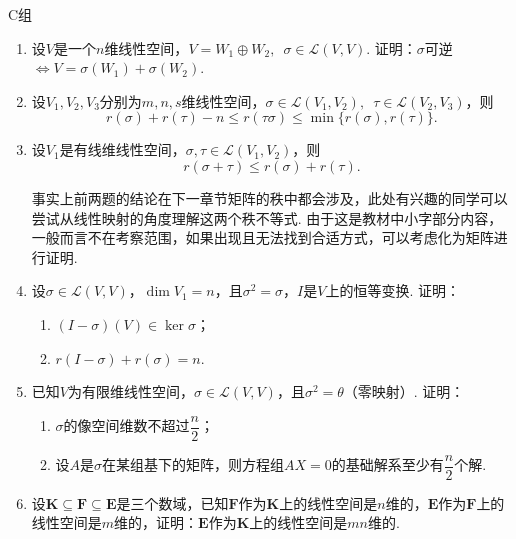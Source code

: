 \centerline{\heiti C组}
\begin{enumerate}
    \item 设$V$是一个$n$维线性空间，$V=W_1\oplus W_2,\enspace\sigma\in \mathcal{L}(V,V)$. 证明：$\sigma$可逆$\iff V=\sigma(W_1)+\sigma(W_2)$.

    \item 设$V_1,V_2,V_3$分别为$m,n,s$维线性空间，$\sigma\in \mathcal{L}(V_1,V_2),\enspace\tau\in \mathcal{L}(V_2,V_3)$，则
          \[r(\sigma)+r(\tau)-n \leqslant r(\tau\sigma) \leqslant \min\{r(\sigma),r(\tau)\}.\]

    \item 设$V_1$是有线维线性空间，$\sigma,\tau\in \mathcal{L}(V_1,V_2)$，则
          \[r(\sigma+\tau) \leqslant r(\sigma)+r(\tau).\]

          事实上前两题的结论在下一章节矩阵的秩中都会涉及，此处有兴趣的同学可以尝试从线性映射的角度理解这两个秩不等式. 由于这是教材中小字部分内容，一般而言不在考察范围，如果出现且无法找到合适方式，可以考虑化为矩阵进行证明.

    \item 设$\sigma\in \mathcal{L}(V,V)$，$\dim V_1=n$，且$\sigma^2=\sigma$，$I$是$V$上的恒等变换. 证明：
          \begin{enumerate}
              \item $(I-\sigma)(V) \in \ker\sigma$；

              \item $r(I-\sigma)+r(\sigma)=n$.
          \end{enumerate}

    \item 已知$V$为有限维线性空间，$\sigma\in \mathcal{L}(V,V)$，且$\sigma^2=\theta$（零映射）. 证明：
          \begin{enumerate}
              \item $\sigma$的像空间维数不超过$\dfrac{n}{2}$；

              \item 设$A$是$\sigma$在某组基下的矩阵，则方程组$AX=0$的基础解系至少有$\dfrac{n}{2}$个解.
          \end{enumerate}

    \item 设$\mathbf{K} \subseteq \mathbf{F} \subseteq \mathbf{E}$是三个数域，已知$\mathbf{F}$作为$\mathbf{K}$上的线性空间是$n$维的，$\mathbf{E}$作为$\mathbf{F}$上的线性空间是$m$维的，证明：$\mathbf{E}$作为$\mathbf{K}$上的线性空间是$mn$维的.
\end{enumerate}
